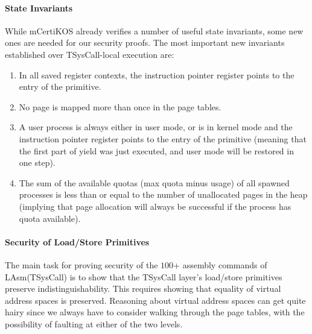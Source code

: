 \paragraph{State Invariants}
While mCertiKOS already verifies a number of useful state 
invariants, some new ones are needed for our security proofs.
The most important new invariants established over 
TSysCall-local execution are:
\begin{enumerate}
\item In all saved register contexts, the instruction pointer 
register points to the entry of the 
 primitive.
\item No page is mapped more than once in the page tables.
\item A user process is always either in user mode, or is in kernel mode 
and the instruction pointer register points to the entry of the  
primitive (meaning that the first part of yield was just executed,
and user mode will be restored in one step).
\item The sum of the available quotas (max quota minus usage) of all
spawned processes is less than or equal to the number of unallocated
pages in the heap (implying that page allocation will always be
successful if the process has quota available).
\end{enumerate}

\paragraph{Security of Load/Store Primitives}
The main task for proving security of the $100$+ assembly commands
of LAsm(TSys\-Call) is to show that the TSysCall layer's load/store 
primitives preserve indistinguishability. This requires showing
that equality of virtual address spaces is preserved. Reasoning 
about virtual address spaces can get quite hairy since we always
have to consider walking through the page tables, with the 
possibility of faulting at either of the two levels.

